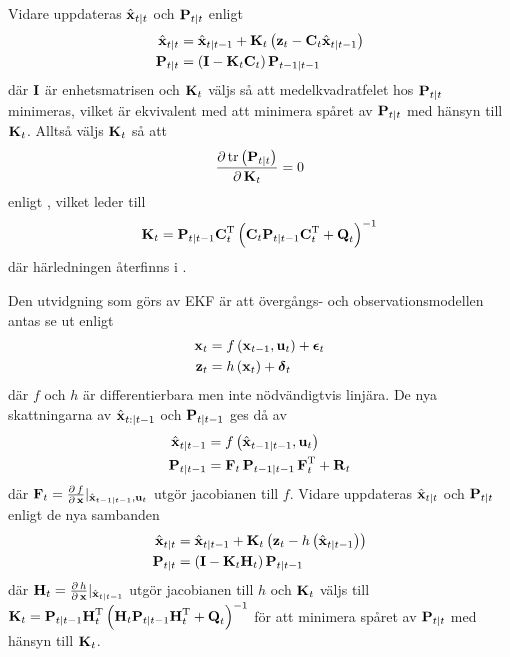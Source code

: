 \documentclass[11pt]{article}
\newcommand{\bfr}[1]{\textbf{\textrm{{#1}}}}
\begin{document}
\begin{flushleft}
Vidare uppdateras $\hat{\bfr{x}}_{t\vert t}$ och $\bfr{P}_{t\vert t}$ enligt
\begin{align*}
	\hat{\bfr{x}}_{t\vert t} &= \hat{\bfr{x}}_{t\vert t-1} + \bfr{K}_{t}\left(\bfr{z}_{t} - \bfr{C}_{t}\hat{\bfr{x}}_{t\vert t-1}\right) \\
	\bfr{P}_{t\vert t} &= \left(\bfr{I} - \bfr{K}_{t}\bfr{C}_{t}\right)\bfr{P}_{t-1\vert t-1}
\end{align*}
där $\bfr{I}$ är enhetsmatrisen och $\bfr{K}_{t}$ väljs så att medelkvadratfelet hos $\bfr{P}_{t\vert t}$ minimeras, vilket är ekvivalent med att minimera spåret av $\bfr{P}_{t\vert t}$ med hänsyn till $\bfr{K}_{t}$. Alltså väljs $\bfr{K}_{t}$ så att
\begin{align*}
	\frac{\partial\,\mathrm{tr}\left(\bfr{P}_{t\vert t}\right)}{\partial\,\bfr{K}_{t}} = 0
\end{align*}
enligt \cite{trace}, vilket leder till
\begin{align*}
	\bfr{K}_{t} = \bfr{P}_{t\vert t-1}\bfr{C}_{t}^{\mathrm{T}}\left(\bfr{C}_{t}\bfr{P}_{t\vert t-1}\bfr{C}_{t}^{\mathrm{T}} + \bfr{Q}_{t}\right)^{-1}
\end{align*}
där härledningen återfinns i \cite{filtering}. 

Den utvidgning som görs av EKF är att övergångs- och observationsmodellen antas se ut enligt
\begin{align*}
	\bfr{x}_{t} &= f\left(\bfr{x}_{t-1}, \bfr{u}_{t}\right) + \boldsymbol{\epsilon}_{t} \\
	\bfr{z}_{t} &= h\left(\bfr{x}_{t}\right) + \boldsymbol{\delta}
_{t}
\end{align*}
där $f$ och $h$ är differentierbara men inte nödvändigtvis linjära. De nya skattningarna av $\hat{\bfr{x}}_{t:\vert t-1}$ och $\bfr{P}_{t\vert t-1}$ ges då av 
\begin{align*}
	\hat{\bfr{x}}_{t\vert t-1} &= f\left(\hat{\bfr{x}}_{t-1\vert t-1},\bfr{u}_{t}\right) \\
	\bfr{P}_{t\vert t-1} & = \bfr{F}_{t}\,\bfr{P}_{t-1\vert t-1}\,\bfr{F}_{t}^{\mathrm{T}} + \bfr{R}_t
\end{align*}
där $\bfr{F}_{t} = \frac{\partial\,f}{\partial\,\bfr{x}}\rvert_{\hat{\bfr{x}}_{t-1 \vert t-1}, \bfr{u}_{t}}$ utgör jacobianen till $f$. Vidare uppdateras $\hat{\bfr{x}}_{t\vert t}$ och $\bfr{P}_{t\vert t}$ enligt de nya sambanden
\begin{align*}
	\hat{\bfr{x}}_{t\vert t} &= \hat{\bfr{x}}_{t\vert t-1} + \bfr{K}_{t}\left(\bfr{z}_{t} - h\left(\hat{\bfr{x}}_{t\vert t-1}\right)\right) \\
	\bfr{P}_{t\vert t} &= \left(\bfr{I} - \bfr{K}_{t}\bfr{H}_{t}\right)\bfr{P}_{t\vert t-1}	
\end{align*}
där $\bfr{H}_{t} = \frac{\partial\,h}{\partial\,\bfr{x}}\rvert_{\hat{\bfr{x}}_{t\vert t-1}}$ utgör jacobianen till $h$ och $\bfr{K}_{t}$ väljs till $\bfr{K}_{t} = \bfr{P}_{t\vert t-1}\bfr{H}_{t}^{\mathrm{T}}\left(\bfr{H}_{t}\bfr{P}_{t\vert t-1}\bfr{H}_{t}^{\mathrm{T}} + \bfr{Q}_{t}\right)^{-1}$ för att minimera spåret av $\bfr{P}_{t\vert t}$ med hänsyn till $\bfr{K}_{t}$.


\end{flushleft}
\end{document}
